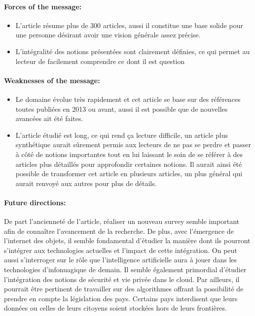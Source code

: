\documentclass[11pt]{article}
\begin{document}
\paragraph{Forces of the message:}
\begin{itemize}
		\item L'article résume plus de 300 articles, aussi il constitue une base solide pour une personne désirant avoir une vision générale assez précise.
		\item L'intégralité des notions présentées sont clairement définies, ce qui permet au lecteur de facilement
                    comprendre ce dont il est question
\end{itemize}


\paragraph{Weaknesses of the message:}
\begin{itemize}
		\item Le domaine évolue très rapidement et cet article se base sur des références toutes publiées en 2013 ou avant, aussi il est possible que de 
			nouvelles avancées ait été faites.
		\item L'article étudié est long, ce qui rend ça lecture difficile, un article plus synthétique aurait sûrement permis aux lecteurs de ne pas se perdre et 
			passer à côté de notions importantes tout en lui laissant le soin de se référer à des articles plus
                        détaillés pour approfondir certaines notions. Il aurait ainsi été possible de transformer cet article en
                        plusieurs articles, un plus général qui aurait renvoyé aux autres pour plus de détails.
\end{itemize}

\paragraph{Future directions:}
De part l'ancienneté de l'article, réaliser un nouveau survey semble important afin de connaître l'avancement de la recherche. De plus, avec l'émergence de l'internet des
objets, il semble fondamental d'étudier la manière dont ils pourront s'intégrer aux technologies actuelles et l'impact de cette intégration. On peut aussi s'interroger sur
le rôle que l'intelligence artificielle aura à jouer dans les technologies d'infonuagique de demain. Il semble également
primordial d'étudier l'intégration des notions de sécurité et vie privée dans le cloud. Par ailleurs, il pourrait être pertinent
de travailler sur des algorithmes offrant la possibilité de prendre en compte la législation des pays. Certains pays interdisent
que leurs données ou celles de leurs citoyens soient stockées hors de leurs frontières. 
\end{document}
